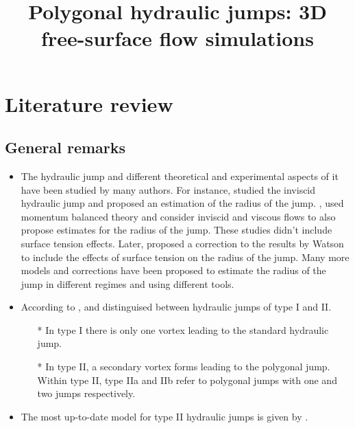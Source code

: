 \documentclass[english,11pt]{article}
\let\cite=\citet
\numberwithin{remark}{subsection}
\begin{document}
\title{Polygonal hydraulic jumps: 3D free-surface flow simulations}
\maketitle



\section{Literature review}

\subsection{General remarks}
\begin{itemize}
\item The hydraulic jump and different theoretical and experimental aspects of it have been studied by many
  authors. For instance, \cite{rayleigh1914theory} studied the inviscid hydraulic jump and proposed an
  estimation of the radius of the jump. 
  \cite{watson1964radial}, used momentum balanced theory and consider inviscid and viscous flows to also propose estimates
  for the radius of the jump. These studies didn't include surface tension effects. 
  Later, \cite{bush2003influence} proposed a correction to the results by Watson to include the effects of surface
  tension on the radius of the jump. Many more models and corrections have been proposed to estimate the radius of the
  jump in different regimes and using different tools. 
  
\item According to \cite{labousse2013hydraulic}, \cite{bohr1996hydraulic} and \cite{watanabe2003integral}
  distinguised between hydraulic jumps of type I and II.
  \begin{itemize}
  \item[*] In type I there is only one vortex leading to the standard hydraulic jump.
  \item[*] In type II, a secondary vortex forms leading to the polygonal jump.
    Within type II, type IIa and IIb refer to polygonal jumps with one and two jumps respectively.
  \end{itemize}

\item The most up-to-date model for type II hydraulic jumps is given by \cite{martens2012model}.
\end{itemize}
\end{document}
